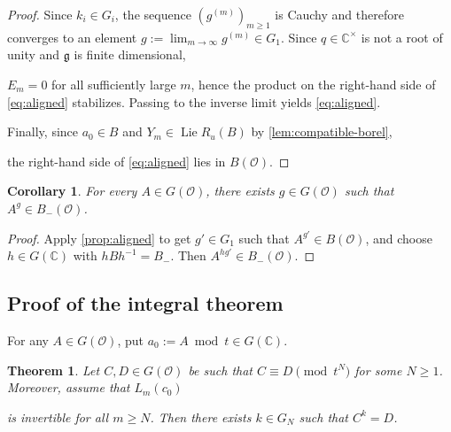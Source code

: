 \documentclass[11pt]{amsart}
\numberwithin{equation}{section}
\newtheorem{theorem}{Theorem}[section]
\newtheorem{corollary}[corollary]{Corollary}
\theoremstyle{definition}
\theoremstyle{remark}
\begin{document}
\begin{proof}
Since $k_i\in G_i$, the sequence $(g^{(m)})_{m\geq 1}$ is Cauchy and therefore converges to an element $g:=\lim_{m\to\infty}g^{(m)}\in G_1$. Since $q\in\mathbb{C}^{\times}$ is not a root of unity and $\mathfrak{g}$ is finite dimensional,

$E_m=0$ for all sufficiently large $m$, hence the product on the right-hand side of \eqref{eq:aligned}
stabilizes. Passing to the inverse limit yields
\eqref{eq:aligned}.

Finally, since $a_0\in B$ and $Y_m\in\operatorname{Lie}R_u(B)$ by
\cref{lem:compatible-borel},

the right-hand side of \eqref{eq:aligned} lies in
$B(\mathcal{O})$.
\end{proof}

\begin{corollary}\label{cor:borel-normal}
For every $A\in G(\mathcal{O})$, there exists $g\in G(\mathcal{O})$ such that
$A^g\in B_-(\mathcal{O})$.
\end{corollary}

\begin{proof}
Apply \cref{prop:aligned} to get $g'\in G_1$ such that $A^{g'}\in B(\mathcal{O})$, and choose $h\in G(\mathbb{C})$ with
$hBh^{-1}=B_-$.  Then $A^{hg'}\in B_-(\mathcal{O})$.
\end{proof}
\subsection{Proof of the integral theorem} 
For any $A\in G(\mathcal{O})$, put $a_0:=A\bmod t\in G(\mathbb C)$.
\begin{theorem}\label{thm:rigidity}
Let $C,D\in G(\mathcal O)$ be such that
$C\equiv D\pmod{t^N}$ for some $N\geq 1$. Moreover, assume that $L_m(c_0)$

is invertible for all $m\geq N$. Then there exists $k\in G_N$ such
that $C^k=D$.
\end{theorem}
\end{document}

